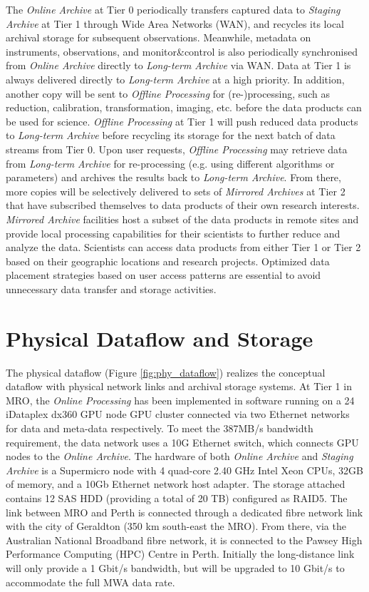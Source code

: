 \documentclass[11pt,twoside]{article}
\begin{document}
The \emph{Online Archive} at Tier 0 periodically transfers captured data to \emph{Staging Archive} at Tier 1 through Wide Area Networks (WAN), and recycles its local archival storage for subsequent observations. Meanwhile, metadata on instruments, observations, and monitor\&control is also periodically synchronised from \emph{Online Archive} directly to \emph{Long-term Archive} via WAN. Data at Tier 1 is always delivered directly to \emph{Long-term Archive} at a high priority.  In addition, another copy will be sent to \emph{Offline Processing} for (re-)processing, such as reduction, calibration, transformation, imaging, etc. before the data products can be used for science.   \emph{Offline Processing} at Tier 1 will push reduced data products to \emph{Long-term Archive} before recycling its storage for the next batch of data streams from Tier 0. Upon user requests, \emph{Offline Processing} may retrieve data from \emph{Long-term Archive} for re-processing (e.g. using different algorithms or parameters) and archives the results back to \emph{Long-term Archive}. From there, more copies will be selectively delivered to sets of \emph{Mirrored Archives} at Tier 2 that have subscribed themselves to data products of their own research interests. \emph{Mirrored Archive} facilities host a subset of the data products in remote sites and provide local processing capabilities for their scientists to further reduce and analyze the data. Scientists can access data products from either Tier 1 or Tier 2 based on their geographic locations and research projects. Optimized data placement strategies based on user access patterns are essential to avoid unnecessary data transfer and storage activities.


\section{Physical Dataflow and Storage}
The physical dataflow (Figure \ref{fig:phy_dataflow}) realizes the conceptual dataflow with physical network links and archival storage systems. At Tier 1 in MRO, the \emph{Online Processing} has been implemented in software running on a 24 iDataplex dx360 GPU node GPU cluster connected via two Ethernet networks for data and meta-data respectively. To meet the 387MB/s bandwidth requirement, the data network uses a 10G Ethernet switch, which connects GPU nodes to the \emph{Online Archive}. The hardware of both \emph{Online Archive} and \emph{Staging Archive} is a Supermicro node with 4 quad-core 2.40 GHz Intel Xeon CPUs, 32GB of memory, and a 10Gb Ethernet network host adapter. The storage attached contains 12 SAS HDD (providing a total of 20 TB) configured as RAID5. The link between MRO and Perth is connected through a dedicated fibre network link with the city of Geraldton (350 km south-east the MRO). From there, via the Australian National Broadband fibre network, it is connected to the Pawsey High Performance Computing (HPC) Centre in Perth. Initially the long-distance link will only provide a 1 Gbit/s bandwidth, but will be upgraded to 10 Gbit/s to accommodate the full MWA data rate.
\end{document}

